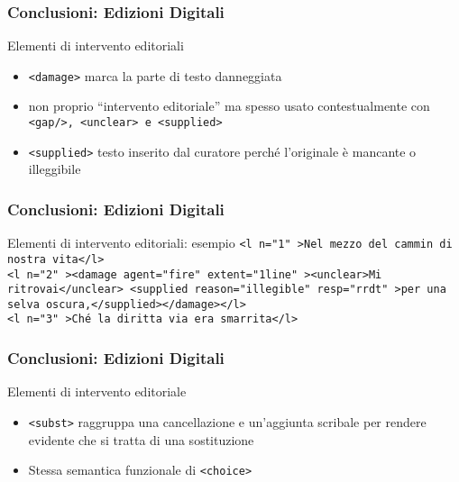 \begin{frame}
    \frametitle{Conclusioni: Edizioni Digitali}
    \addtocounter{nframe}{1}
    

    \begin{block}{Elementi di intervento editoriali}
        \begin{itemize}
            \item \texttt{<damage>} marca la parte di testo danneggiata
            \item[] non proprio “intervento editoriale” ma spesso usato contestualmente con \texttt{<gap/>,  <unclear> e <supplied>}
            \item \texttt{<supplied>} testo inserito dal curatore perché l’originale è mancante o illeggibile
        \end{itemize} 
    \end{block}
\end{frame}

\begin{frame}
    \frametitle{Conclusioni: Edizioni Digitali}
    \addtocounter{nframe}{1}
    

    \begin{block}{Elementi di intervento editoriali: esempio}
        \texttt{<l n="1" >Nel mezzo del cammin di nostra vita</l>}
        \\\texttt{<l n="2" ><damage agent="fire" extent="1line" ><unclear>Mi ritrovai</unclear> <supplied reason="illegible" resp="rrdt" >per una selva oscura,</supplied></damage></l>}
        \\\texttt{<l n="3" >Ché la diritta via era smarrita</l>}
    \end{block}
\end{frame}

\begin{frame}
    \frametitle{Conclusioni: Edizioni Digitali}
    \addtocounter{nframe}{1}
    

    \begin{block}{Elementi di intervento editoriale}
        \begin{itemize}
            \item \texttt{<subst>} raggruppa una cancellazione e un’aggiunta scribale per rendere evidente che si tratta di una sostituzione
            \item[] Stessa semantica funzionale di \texttt{<choice>}
        \end{itemize}
    \end{block}

\end{frame}

